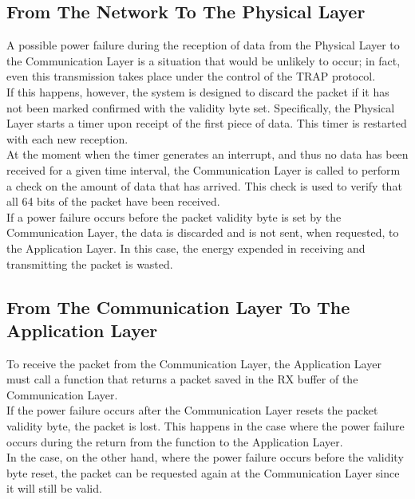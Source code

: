 \subsection{From The Network To The Physical Layer}
A possible power failure during the reception of data from the Physical Layer to the Communication Layer is a situation that would be unlikely to occur; in fact, even this transmission takes place under the control of the TRAP protocol.\\
If this happens, however, the system is designed to discard the packet if it has not been marked confirmed with the validity byte set.
Specifically, the Physical Layer starts a timer upon receipt of the first piece of data. This timer is restarted with each new reception.\\
At the moment when the timer generates an interrupt, and thus no data has been received for a given time interval, the Communication Layer is called to perform a check on the amount of data that has arrived. This check is used to verify that all 64 bits of the packet have been received.\\
If a power failure occurs before the packet validity byte is set by the Communication Layer, the data is discarded and is not sent, when requested, to the Application Layer. In this case, the energy expended in receiving and transmitting the packet is wasted.
\subsection{From The Communication Layer To The Application Layer}
To receive the packet from the Communication Layer, the Application Layer must call a function that returns a packet saved in the RX buffer of the Communication Layer.\\ 
If the power failure occurs after the Communication Layer resets the packet validity byte, the packet is lost. This happens in the case where the power failure occurs during the return from the function to the Application Layer.\\
In the case, on the other hand, where the power failure occurs before the validity byte reset, the packet can be requested again at the Communication Layer since it will still be valid.
\newpage